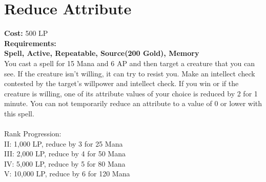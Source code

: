 \section{Reduce Attribute}\label{spell:reduceAbility}
\textbf{Cost:} 500 LP\\
\textbf{Requirements:}\\
\textbf{Spell, Active, Repeatable, Source(200 Gold), Memory}\\
You cast a spell for 15 Mana and 6 AP and then target a creature that you can see.
If the creature isn't willing, it can try to resist you.
Make an intellect check contested by the target's willpower and intellect check.
If you win or if the creature is willing, one of its attribute values of your choice is reduced by 2 for 1 minute.
You can not temporarily reduce an attribute to a value of 0 or lower with this spell. \\
\\
Rank Progression:\\
II: 1,000 LP, reduce by 3 for 25 Mana\\
III: 2,000 LP, reduce by 4 for 50 Mana\\
IV: 5,000 LP, reduce by 5 for 80 Mana\\
V: 10,000 LP, reduce by 6 for 120 Mana\\
